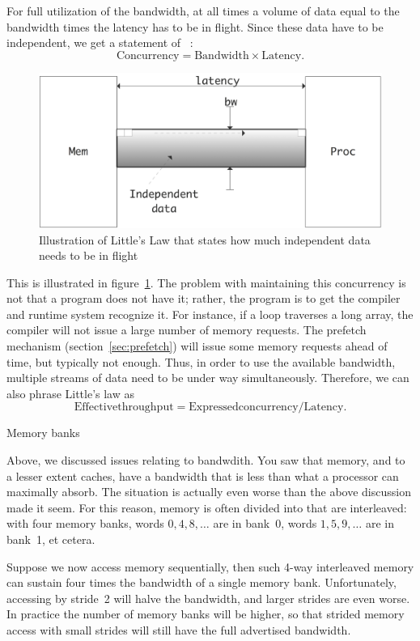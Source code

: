 For full utilization of the bandwidth,
at all times a volume of data equal to the bandwidth times
the latency has to be in flight. Since these data have to be
independent, we get a statement of ~\cite{Little:law}:
\[ \mathrm{Concurrency}=\mathrm{Bandwidth}\times \mathrm{Latency}. \]
\begin{figure}[ht]
  \includegraphics[scale=.13]{graphics-public/little}
  \caption{Illustration of Little's Law that states how much
    independent data needs to be in flight}
  \label{fig:little}
\end{figure}
This is illustrated in figure~\ref{fig:little}. The problem with
maintaining this concurrency is not that a program does not have it;
rather, the program is to get the compiler and runtime system
recognize it. For instance, if a loop traverses a long array, the
compiler will not issue a large number of memory requests. The
prefetch mechanism (section~\ref{sec:prefetch}) will issue some memory
requests ahead of time, but typically not enough. Thus, in order to
use the available bandwidth, multiple streams of data need to be under
way simultaneously. Therefore, we can also phrase Little's law as
\[ \mathrm{Effective throughput}=\mathrm{Expressed concurrency} / \mathrm{Latency}. \]

 {Memory banks}
\label{sec:banks}

Above, we discussed issues relating to bandwdith. You saw that memory,
and to a lesser extent caches, have a bandwidth that is less than what
a processor can maximally absorb. The situation is actually even worse
than the above discussion made it seem. For this reason, memory is
often divided into  that are interleaved: with
four memory banks, words $0,4,8,\ldots$ are in bank~0, words
$1,5,9,\ldots$ are in bank~1, et cetera. 

Suppose we now access memory sequentially, then such 4-way interleaved
memory can sustain four times the bandwidth of a single memory
bank. Unfortunately,  accessing by stride~2 will halve the bandwidth,
and larger strides are even worse. In practice the number of memory
banks will be higher, so that strided memory access with small strides
will still have the full advertised bandwidth.


